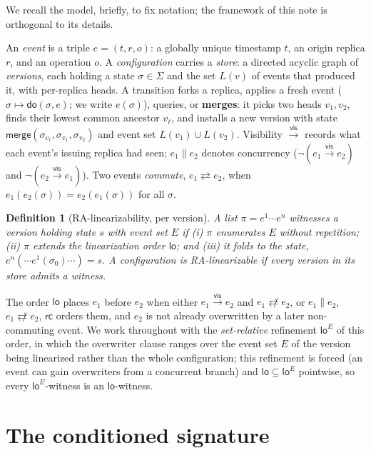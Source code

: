 \documentclass[11pt]{article}
\newtheorem{definition}[theorem]{Definition}
\newcommand{\vis}{\xrightarrow{\mathsf{vis}}}
\newcommand{\comm}{\rightleftarrows}
\newcommand{\ncomm}{\not\rightleftarrows}
\newcommand{\Merge}{\mathsf{merge}}
\newcommand{\Sinit}{\sigma_0}
\newcommand{\dolab}{\mathsf{do}}
\newcommand{\loE}[1]{\mathsf{lo}^{#1}}
\begin{document}
We recall the model, briefly, to fix notation; the framework of this note is
orthogonal to its details.

An \emph{event} is a triple $e=(t,r,o)$: a globally unique timestamp $t$, an
origin replica $r$, and an operation $o$. A \emph{configuration} carries a
\emph{store}: a directed acyclic graph of \emph{versions}, each holding a state
$\sigma\in\Sigma$ and the set $L(v)$ of events that produced it, with per-replica
heads. A transition forks a replica, applies a fresh event
($\sigma \mapsto \dolab(\sigma,e)$; we write $e(\sigma)$), queries, or
\textbf{merges}: it picks two heads $v_1,v_2$, finds their lowest common ancestor
$v_\ell$, and installs a new version with state
$\Merge(\sigma_{v_\ell},\sigma_{v_1},\sigma_{v_2})$ and event set
$L(v_1)\cup L(v_2)$. Visibility $\vis$ records what each event's issuing replica
had seen; $e_1 \parallel e_2$ denotes concurrency ($\neg(e_1\vis e_2)$ and
$\neg(e_2\vis e_1)$). Two events \emph{commute}, $e_1 \comm e_2$, when
$e_1(e_2(\sigma))=e_2(e_1(\sigma))$ for all $\sigma$.

\begin{definition}[RA-linearizability, per version]
\label{def:ralin}
A list $\pi=e^1\cdots e^n$ \emph{witnesses} a version holding state $s$ with event
set $E$ if (i) $\pi$ enumerates $E$ without repetition; (ii) $\pi$ extends the
linearization order $\mathsf{lo}$; and (iii) it folds to the state,
$e^n(\cdots e^1(\Sinit)\cdots)=s$. A configuration is \emph{RA-linearizable} if
every version in its store admits a witness.
\end{definition}

The order $\mathsf{lo}$ places $e_1$ before $e_2$ when either $e_1\vis e_2$ and
$e_1\ncomm e_2$, or $e_1\parallel e_2$, $e_1\ncomm e_2$, $\mathsf{rc}$ orders them,
and $e_2$ is not already overwritten by a later non-commuting event. We work
throughout with the \emph{set-relative} refinement $\loE{E}$ of this order, in
which the overwriter clause ranges over the event set $E$ of the version being
linearized rather than the whole configuration; this refinement is forced (an
event can gain overwriters from a concurrent branch) and $\mathsf{lo}\subseteq
\loE{E}$ pointwise, so every $\loE{E}$-witness is an $\mathsf{lo}$-witness.

\section{The conditioned signature}
\label{sec:sig}
\end{document}
